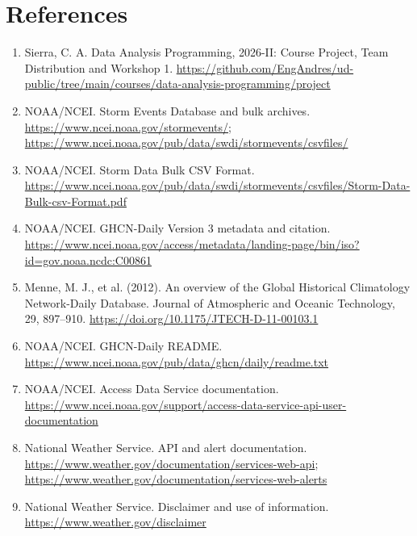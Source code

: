 \section*{References}
\begin{enumerate}
\item Sierra, C. A. Data Analysis Programming, 2026-II: Course Project, Team Distribution and Workshop 1. \url{https://github.com/EngAndres/ud-public/tree/main/courses/data-analysis-programming/project}
\item NOAA/NCEI. Storm Events Database and bulk archives. \url{https://www.ncei.noaa.gov/stormevents/}; \url{https://www.ncei.noaa.gov/pub/data/swdi/stormevents/csvfiles/}
\item NOAA/NCEI. Storm Data Bulk CSV Format. \url{https://www.ncei.noaa.gov/pub/data/swdi/stormevents/csvfiles/Storm-Data-Bulk-csv-Format.pdf}
\item NOAA/NCEI. GHCN-Daily Version 3 metadata and citation. \url{https://www.ncei.noaa.gov/access/metadata/landing-page/bin/iso?id=gov.noaa.ncdc:C00861}
\item Menne, M. J., et al. (2012). An overview of the Global Historical Climatology Network-Daily Database. Journal of Atmospheric and Oceanic Technology, 29, 897--910. \url{https://doi.org/10.1175/JTECH-D-11-00103.1}
\item NOAA/NCEI. GHCN-Daily README. \url{https://www.ncei.noaa.gov/pub/data/ghcn/daily/readme.txt}
\item NOAA/NCEI. Access Data Service documentation. \url{https://www.ncei.noaa.gov/support/access-data-service-api-user-documentation}
\item National Weather Service. API and alert documentation. \url{https://www.weather.gov/documentation/services-web-api}; \url{https://www.weather.gov/documentation/services-web-alerts}
\item National Weather Service. Disclaimer and use of information. \url{https://www.weather.gov/disclaimer}
\end{enumerate}
